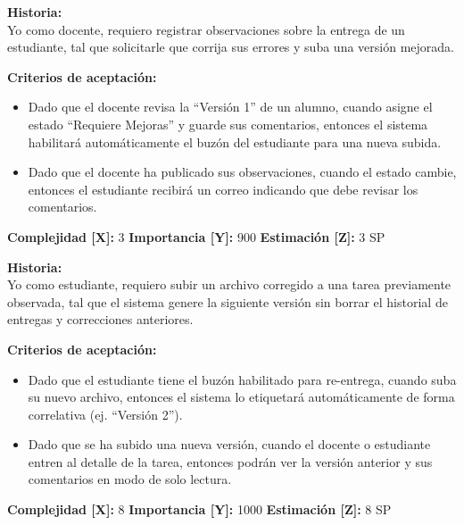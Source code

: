 \documentclass[12pt,a4paper]{article}
\begin{document}
\vspace{0.5em}

\begin{tcolorbox}[title=\textbf{HU-04: Evaluar entrega y solicitar versión corregida}]
\textbf{Historia:} \\
Yo como docente, requiero registrar observaciones sobre la entrega de un estudiante, tal que solicitarle que corrija sus errores y suba una versión mejorada.

\vspace{0.5em}
\textbf{Criterios de aceptación:}
\begin{itemize}
    \item Dado que el docente revisa la ``Versión 1'' de un alumno, cuando asigne el estado ``Requiere Mejoras'' y guarde sus comentarios, entonces el sistema habilitará automáticamente el buzón del estudiante para una nueva subida.
    \item Dado que el docente ha publicado sus observaciones, cuando el estado cambie, entonces el estudiante recibirá un correo indicando que debe revisar los comentarios.
\end{itemize}
\textbf{Complejidad [X]:} 3 \hfill \textbf{Importancia [Y]:} 900 \hfill \textbf{Estimación [Z]:} 3 SP
\end{tcolorbox}

\vspace{0.5em}

\begin{tcolorbox}[title=\textbf{HU-05: Subir versiones iterativas de una tarea}]
\textbf{Historia:} \\
Yo como estudiante, requiero subir un archivo corregido a una tarea previamente observada, tal que el sistema genere la siguiente versión sin borrar el historial de entregas y correcciones anteriores.

\vspace{0.5em}
\textbf{Criterios de aceptación:}
\begin{itemize}
    \item Dado que el estudiante tiene el buzón habilitado para re-entrega, cuando suba su nuevo archivo, entonces el sistema lo etiquetará automáticamente de forma correlativa (ej. ``Versión 2'').
    \item Dado que se ha subido una nueva versión, cuando el docente o estudiante entren al detalle de la tarea, entonces podrán ver la versión anterior y sus comentarios en modo de solo lectura.
\end{itemize}
\textbf{Complejidad [X]:} 8 \hfill \textbf{Importancia [Y]:} 1000 \hfill \textbf{Estimación [Z]:} 8 SP
\end{tcolorbox}
\end{document}
